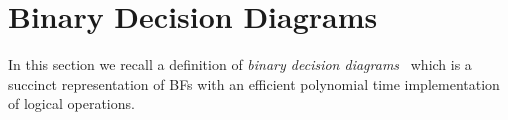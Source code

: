 \documentclass[
  digital, %
  twoside, %
  table,   %
  nolof,     %
  nolot,     %
]{fithesis3}
\let\setbuilder\set
\newcommand{\simpleset}[1]{\{{#1}\}}
\renewcommand{\set}[1]{\normalexpandarg\IfSubStr{#1}{|}{\setbuilder{#1}}{\simpleset{#1}}}
\newtheorem{theorem}{Theorem}[chapter] %
\theoremstyle{definition}
\theoremstyle{remark}
\newcommand{\seman}[1]{\left\llbracket {#1} \right\rrbracket}
\newcommand{\substitute}[2]{\left[ \nicefrac{#2}{#1} \right]}
\begin{document}


\section{Binary Decision Diagrams}
In this section we recall a definition of \emph{binary decision diagrams}~\cite{BDD} which is a succinct representation of BFs with an efficient polynomial time implementation of logical operations.
\end{document}

